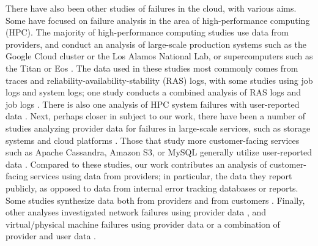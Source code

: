 There have also been other studies of failures in the cloud, with various aims.
Some have focused on failure analysis in the area of high-performance computing (HPC).
The majority of high-performance computing studies use data from providers, and conduct an analysis of large-scale production systems such as the Google Cloud cluster or the Los Alamos National Lab, or supercomputers such as the Titan or Eos \cite{chen2014, elsayed2017, liang2006, zheng2011, kavulya2010, gupta2015, gupta2017, di2019, elsayed2013, martino2014, schroeder2010, javadi2013, schroeder2007}.
The data used in these studies most commonly comes from traces and reliability-availability-stability (RAS) logs, with some studies using job logs and system logs; one study conducts a combined analysis of RAS logs and job logs \cite{zheng2011}.
There is also one analysis of HPC system failures with user-reported data \cite{gray1986}.
Next, perhaps closer in subject to our work, there have been a number of studies analyzing provider data for failures in large-scale services, such as storage systems and cloud platforms \cite{oppenheimer2003, ford2010, schroeder2007, javadi2013, garraghan2014, yalagandula2004, li2013, zhou2015}.
Those that study more customer-facing services such as Apache Cassandra, Amazon S3, or MySQL generally utilize user-reported data \cite{frattini2013, yuan2014, palankar2008, fonseca2010, fonseca2010, benson2010, jiang2008, yin2011}.
Compared to these studies, our work contributes an analysis of customer-facing services using data from providers; in particular, the data they report publicly, as opposed to data from internal error tracking databases or reports.
Some studies synthesize data both from providers and from customers \cite{ostermann2008, sahoo2010}.
Finally, other analyses investigated network failures using provider data \cite{gill2011, banerjee2015, turner2010}, and virtual/physical machine failures using provider data \cite{vishwanath2010, nightingale2011, rosa2015} or a combination of provider and user data \cite{birke2014}.
